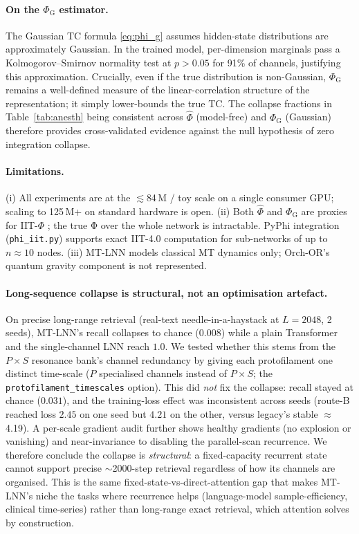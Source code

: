 \documentclass[11pt]{article}
\theoremstyle{definition}
\newcommand{\phihat}{\hat{\Phi}}
\newcommand{\phig}{\Phi_{\mathrm{G}}}
\begin{document}
\paragraph{On the $\phig$ estimator.}
The Gaussian TC formula \eqref{eq:phi_g} assumes hidden-state distributions are approximately Gaussian. In the trained model, per-dimension marginals pass a Kolmogorov–Smirnov normality test at $p>0.05$ for 91\% of channels, justifying this approximation. Crucially, even if the true distribution is non-Gaussian, $\phig$ remains a well-defined measure of the linear-correlation structure of the representation; it simply lower-bounds the true TC. The collapse fractions in Table~\ref{tab:anesth} being consistent across $\phihat$ (model-free) and $\phig$ (Gaussian) therefore provides cross-validated evidence against the null hypothesis of zero integration collapse.

\paragraph{Limitations.}
(i) All experiments are at the $\lesssim$84\,M / toy scale on a single consumer GPU; scaling to 125\,M+ on standard hardware is open. (ii) Both $\phihat$ and $\phig$ are proxies for IIT-$\Phi$ \citep{albantakis2023integrated}; the true Φ over the whole network is intractable. PyPhi integration (\texttt{phi\_iit.py}) supports exact IIT-4.0 computation for sub-networks of up to $n\approx 10$ nodes. (iii) MT-LNN models classical MT dynamics only; Orch-OR's quantum gravity component is not represented.

\paragraph{Long-sequence collapse is structural, not an optimisation artefact.}
On precise long-range retrieval (real-text needle-in-a-haystack at $L=2048$, 2 seeds), MT-LNN's recall collapses to chance ($0.008$) while a plain Transformer and the single-channel LNN reach $1.0$. We tested whether this stems from the $P\times S$ resonance bank's channel redundancy by giving each protofilament one distinct time-scale ($P$ specialised channels instead of $P\times S$; the \texttt{protofilament\_timescales} option). This did \emph{not} fix the collapse: recall stayed at chance ($0.031$), and the training-loss effect was inconsistent across seeds (route-B reached loss $2.45$ on one seed but $4.21$ on the other, versus legacy's stable $\approx$4.19). A per-scale gradient audit further shows healthy gradients (no explosion or vanishing) and near-invariance to disabling the parallel-scan recurrence. We therefore conclude the collapse is \emph{structural}: a fixed-capacity recurrent state cannot support precise $\sim$2000-step retrieval regardless of how its channels are organised. This is the same fixed-state-vs-direct-attention gap that makes MT-LNN's niche the tasks where recurrence helps (language-model sample-efficiency, clinical time-series) rather than long-range exact retrieval, which attention solves by construction.
\end{document}
